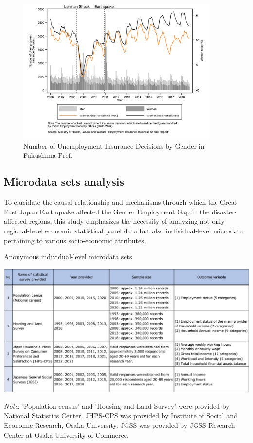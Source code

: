 \documentclass[a4paper,12pt]{article}
\begin{document}
\begin{figure}[h!]
    \centering
    \includegraphics[width=0.9\textwidth]{Number of Unemployment Insurance decisions.jpg}  %
    \caption{Number of Unemployment Insurance Decisions by Gender in Fukushima Pref.}
    \label{fig:employment_insurance_decisions}
\end{figure}


\clearpage
\subsection{Microdata sets analysis}
\label{sec5.1}

To elucidate the causal relationship and mechanisms through which the Great East Japan Earthquake affected the Gender Employment Gap in the disaster-affected regions, this study emphasizes the necessity of analyzing not only regional-level economic statistical panel data but also individual-level microdata pertaining to various socio-economic attributes.

\begin{table}[h!]
    \centering
    \caption{Anonymous individual-level microdata sets}
    \label{tab:list}
    \includegraphics[width=1.0\textwidth]{list.png} 

    \begin{tablenotes}
        \item{\small{\textit{Note}: 'Population census' and 'Housing and Land Survey' were provided by National Statistics Center. JHPS-CPS was provided by Institute of Social and Economic Research, Osaka University. JGSS was provided by JGSS Research Center at Osaka University of Commerce.}}
    \end{tablenotes}
    
\end{table}
\end{document}

